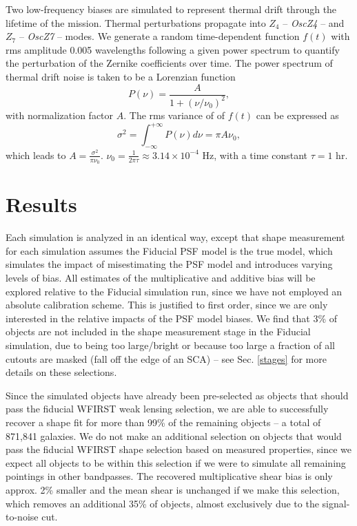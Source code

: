\documentclass[aps,prd, amsmath,amssymb,superscriptaddress,showkeys,nofootinbib,reprint,preprintnumbers]{revtex4-1}
\begin{document}
Two low-frequency biases are simulated to represent thermal drift through the lifetime of the mission. Thermal perturbations propagate into $Z_4$ -- \emph{OscZ4} -- and $Z_7$  -- \emph{OscZ7} --  modes.
We generate a random time-dependent function $f(t)$ with rms amplitude 0.005 wavelengths following a given power spectrum to quantify the perturbation of the Zernike coefficients over time. 
The power spectrum of thermal drift noise is taken to be a Lorenzian function 
\begin{equation}
P(\nu)=\frac{A}{1+(\nu/\nu_0)^2},
\end{equation}
with normalization factor $A$. The rms variance of of $f(t)$ can be expressed as
\begin{equation}
\sigma^2 = \int_{-\infty}^{+\infty}P(\nu)d\nu=\pi A\nu_0,
\end{equation}
which leads to $A=\frac{\sigma^2}{\pi\nu_0}$. $\nu_0=\frac{1}{2\pi\tau}\approx 3.14\times10^{-4}$ Hz, with a time constant $\tau=1$ hr.

\section{Results}\label{sec:results2}

Each simulation is analyzed in an identical way, except that shape measurement for each simulation assumes the Fiducial PSF model is the true model, which simulates the impact of misestimating the PSF model and introduces varying levels of bias. 
All estimates of the multiplicative and additive bias will be explored relative to the Fiducial simulation run, since we have not employed an absolute calibration scheme. 
This is justified to first order, since we are only interested in the relative impacts of the PSF model biases.
We find that 3\% of objects are not included in the shape measurement stage in the Fiducial simulation, due to being too large/bright or because too large a fraction of all cutouts are masked (fall off the edge of an SCA) -- see Sec. \ref{stages} for more details on these selections. 

Since the simulated objects have already been pre-selected as objects that should pass the fiducial WFIRST weak lensing selection, we are able to successfully recover a shape fit for more than 99\% of the remaining objects -- a total of 871,841 galaxies. 
We do not make an additional selection on objects that would pass the fiducial WFIRST shape selection based on measured properties, since we expect all objects to be within this selection if we were to simulate all remaining pointings in other bandpasses. 
The recovered multiplicative shear bias is only approx. 2\% smaller and the mean shear is unchanged if we make this selection, which removes an additional 35\% of objects, almost exclusively due to the signal-to-noise cut.
\end{document}
